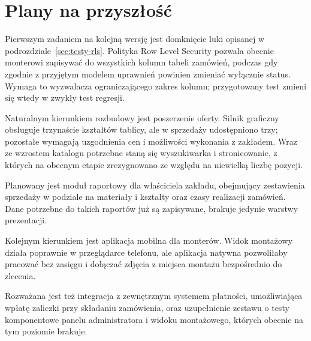 \section{Plany na przyszłość}
\label{sec:plany}

Pierwszym zadaniem na kolejną wersję jest domknięcie luki opisanej w podrozdziale~\ref{sec:testy-rls}. Polityka Row Level Security pozwala obecnie monterowi zapisywać do wszystkich kolumn tabeli zamówień, podczas gdy zgodnie z przyjętym modelem uprawnień powinien zmieniać wyłącznie status. Wymaga to wyzwalacza ograniczającego zakres kolumn; przygotowany test zmieni się wtedy w zwykły test regresji.

Naturalnym kierunkiem rozbudowy jest poszerzenie oferty. Silnik graficzny obsługuje trzynaście kształtów tablicy, ale w sprzedaży udostępniono trzy; pozostałe wymagają uzgodnienia cen i możliwości wykonania z zakładem. Wraz ze wzrostem katalogu potrzebne staną się wyszukiwarka i stronicowanie, z których na obecnym etapie zrezygnowano ze względu na niewielką liczbę pozycji.

Planowany jest moduł raportowy dla właściciela zakładu, obejmujący zestawienia sprzedaży w podziale na materiały i kształty oraz czasy realizacji zamówień. Dane potrzebne do takich raportów już są zapisywane, brakuje jedynie warstwy prezentacji.

Kolejnym kierunkiem jest aplikacja mobilna dla monterów. Widok montażowy działa poprawnie w przeglądarce telefonu, ale aplikacja natywna pozwoliłaby pracować bez zasięgu i dołączać zdjęcia z miejsca montażu bezpośrednio do zlecenia.

Rozważana jest też integracja z zewnętrznym systemem płatności, umożliwiająca wpłatę zaliczki przy składaniu zamówienia, oraz uzupełnienie zestawu o testy komponentowe panelu administratora i widoku montażowego, których obecnie na tym poziomie brakuje.
